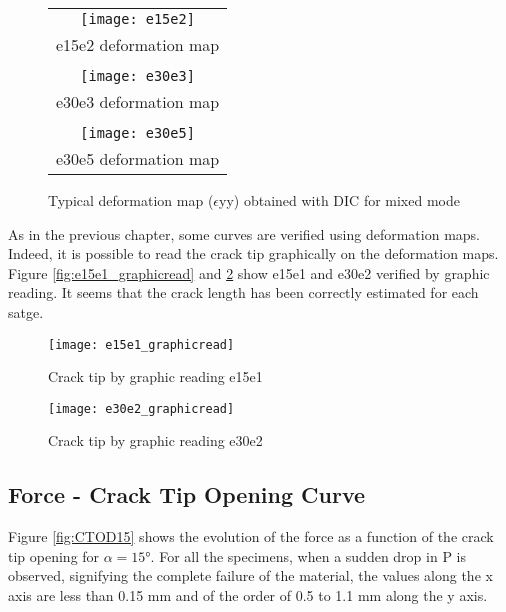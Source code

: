 \begin{figure}[htp]
	\centering
	\begin{tabular}{c}
		\texttt{[image: e15e2]} \\
		e15e2 deformation map \\
		\\
		\texttt{[image: e30e3]} \\
		e30e3 deformation map \\
		\\
		\texttt{[image: e30e5]} \\
		e30e5 deformation map \\
	\end{tabular}
	\caption{Typical deformation map ($\epsilon$yy) obtained with DIC for mixed mode}
	\label{fig:Strain_def_mixedmode}
\end{figure}

As in the previous chapter, some curves are verified using deformation maps. Indeed, it is possible to read the crack tip graphically  on the deformation maps. Figure \ref{fig:e15e1_graphicread} and \ref{fig:e30e2_graphicread} show e15e1 and e30e2 verified by graphic reading. It seems that the crack length has been correctly estimated for each satge.

\begin{figure}[htp]
	\begin{minipage}[c]{.46\linewidth}
		\centering
		\texttt{[image: e15e1\_graphicread]}
		\caption{Crack tip by graphic reading e15e1}
		\label{fig:e15e1_graphicread}
	\end{minipage}
	\hfill%
	\begin{minipage}[c]{.46\linewidth}
		\centering
		\texttt{[image: e30e2\_graphicread]}
		\caption{Crack tip by graphic reading e30e2 }
		\label{fig:e30e2_graphicread}
	\end{minipage}
\end{figure}

\subsection{Force - Crack Tip Opening Curve}

Figure \ref{fig:CTOD15} shows the evolution of the force as a function of the crack tip opening for $\alpha=15°$. For all the specimens, when a sudden drop in P is observed, signifying the complete failure of the material, the values along the x axis are less than 0.15 mm and of the order of 0.5 to 1.1 mm along the y axis.

